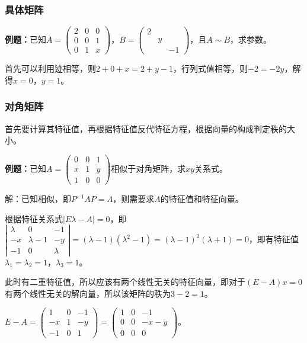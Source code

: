 \documentclass[UTF8, 12pt]{ctexart}
\begin{document}
\subsubsection{具体矩阵}

\textbf{例题：}已知$A=\left(\begin{array}{ccc}
    2 & 0 & 0 \\
    0 & 0 & 1 \\
    0 & 1 & x
\end{array}\right)$，$B=\left(\begin{array}{ccc}
    2 \\
     & y \\
     & & -1
\end{array}\right)$，且$A\sim B$，求参数。\medskip

首先可以利用迹相等，则$2+0+x=2+y-1$，行列式值相等，则$-2=-2y$，解得$x=0$，$y=1$。

\subsubsection{对角矩阵}

首先要计算其特征值，再根据特征值反代特征方程，根据向量的构成判定秩的大小。

\textbf{例题：}已知$A=\left(\begin{array}{ccc}
    0 & 0 & 1 \\
    x & 1 & y \\
    1 & 0 & 0
\end{array}\right)$相似于对角矩阵，求$xy$关系式。

解：已知相似，即$P^{-1}AP=\Lambda$，则需要求$A$的特征值和特征向量。

根据特征关系式$\vert E\lambda-A\vert=0$，即$\left\vert\begin{array}{ccc}
    \lambda & 0 & -1 \\
    -x & \lambda-1 & -y \\
    -1 & 0 & \lambda
\end{array}\right\vert=(\lambda-1)(\lambda^2-1)=(\lambda-1)^2(\lambda+1)=0$，即有特征值$\lambda_1=\lambda_2=1$，$\lambda_3=1$。

此时有二重特征值，所以应该有两个线性无关的特征向量，即对于$(E-A)x=0$有两个线性无关的解向量，所以该矩阵的秩为$3-2=1$。

$E-A=\left(\begin{array}{ccc}
    1 & 0 & -1 \\
    -x & 1 & -y \\
    -1 & 0 & 1
\end{array}\right)=\left(\begin{array}{ccc}
    1 & 0 & -1 \\
    0 & 0 & -x-y \\
    0 & 0 & 0
\end{array}\right)$。
\end{document}
